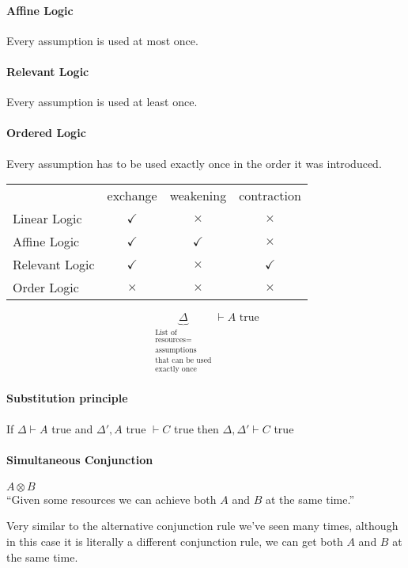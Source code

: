\documentclass[12 pt]{article}
\begin{document}
    \paragraph{Affine Logic} Every assumption is used at most once.
    \paragraph{Relevant Logic} Every assumption is used at least once.
    \paragraph{Ordered Logic} Every assumption has to be used exactly
    once in the order it was introduced.
    \\
    \begin{tabular}{l | c c c}
      &exchange&weakening&contraction
      \\ Linear Logic & $\checkmark$ & $\times$ & $\times$
      \\ Affine Logic & $\checkmark$ & $\checkmark$ & $\times$
      \\ Relevant Logic & $\checkmark$ & $\times$ & $\checkmark$
      \\ Order Logic & $\times$ & $\times$ & $\times$
    \end{tabular}
    $$\underbrace{\Delta}_{\substack{\text{List
          of}\\\text{resources=}\\\text{assumptions}\\\text{that can
          be used}\\\text{exactly once}}} \vdash A \text{ true}$$
    \paragraph{Substitution principle}
    If $\Delta \vdash A$ true and $\Delta', A$ true $\vdash C$ true
    then $\Delta, \Delta' \vdash C$ true
    \paragraph{Simultaneous Conjunction} $A \otimes B$
    \\ ``Given some resources we can achieve both $A$ and $B$ at the
    same time.''
    \begin{prooftree}
    \end{prooftree}
    \begin{prooftree}
    \end{prooftree}
    Very similar to the alternative conjunction rule we've seen many
    times, although in this case it is literally a different
    conjunction rule, we can get both $A$ and $B$ at the same time.
\end{document}
